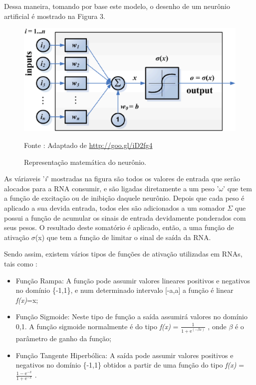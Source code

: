    Dessa maneira, tomando por base este modelo, o desenho de um neurônio artificial é mostrado na Figura 3.

    \begin{figure}[ht]
        \centering
        \label{fig03}
            \includegraphics[keepaspectratio=true, scale=0.27]{editaveis/images/modeloNeuronio.eps}
        \caption{Representação matemática do neurônio.}
        Fonte : Adaptado de \url{http://goo.gl/iD2fg4}
    \end{figure}
    \newpage

    As váriaveis '\textit{i}' mostradas na figura são todos os valores de entrada que serão alocados para a RNA consumir, e são ligadas diretamente a um peso '$\omega$' que tem a função de excitação ou de inibição daquele neurônio.
    Depois que cada peso é aplicado a sua devida entrada, todos eles são adicionados a um somador $\Sigma$ que possui a função de acumular os sinais de entrada devidamente ponderados com seus pesos. O resultado deste somatório é aplicado, então, a uma função de ativação $\sigma$(x) que tem a função de limitar o sinal de saída da RNA.

    Sendo assim, existem vários tipos de funções de ativação utilizadas em RNAs, tais como \cite{Distractions2016}:

    \begin{itemize}
        \item Função Rampa: A função pode assumir valores lineares positivos e negativos no domínio \{-1,1\}, e num determinado intervalo [-a,a] a função é linear \textit{f(x)}=x;
        \item Função Sigmoide: Neste tipo de função a saída assumirá valores no domínio {0,1}. A função sigmoide normalmente é do tipo \textit{f(x)} = $\frac{1}{1+\mathrm{e}^{(-\beta \textit{x})}}$ , onde $\beta$ é o parâmetro de ganho da função;
        \item Função Tangente Hiperbólica: A saída pode assumir valores positivos e negativos no domínio \{-1,1\} obtidos a partir de uma função do tipo \textit{f(x)} = $\frac{1-\mathrm{e}^{-\textit{x}}}{1+\mathrm{e}^{-\textit{x}}}$ .
    \end{itemize}

